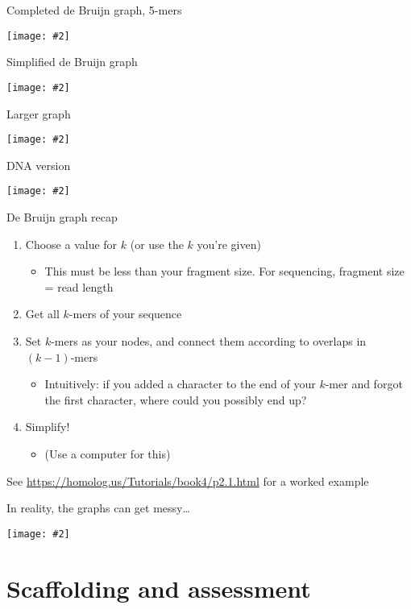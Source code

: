 \documentclass{beamer}
\renewcommand{\c}[1]{\begin{center}#1\end{center}}
\newcommand{\gr}[2][.95]{\c{\texttt{[image: \#2]}}}
\begin{document}
\begin{frame}{Completed de Bruijn graph, 5-mers}
\gr{l4_figs/s18_graph.png}
\end{frame}

\begin{frame}{Simplified de Bruijn graph}
\gr{l4_figs/s19_subgraph.png}
\end{frame}

\begin{frame}{Larger graph}
\gr{l4_figs/s20_table.png}
\end{frame}

\begin{frame}{DNA version}
\gr{l4_figs/s21_kmers.png}
\end{frame}

\begin{frame}{De Bruijn graph recap}
\begin{enumerate}
    \item Choose a value for $k$ (or use the $k$ you're given)
    \begin{itemize}
        \item This must be less than your fragment size. For sequencing, fragment size = read length
    \end{itemize}
    \item Get all $k$-mers of your sequence
    \item Set $k$-mers as your nodes, and connect them according to overlaps in $(k-1)$-mers
    \begin{itemize}
        \item Intuitively: if you added a character to the end of your $k$-mer and forgot the first character, where could you possibly end up?
    \end{itemize}
    \item Simplify!
    \begin{itemize}
        \item (Use a computer for this)
    \end{itemize}
\end{enumerate}

See \url{https://homolog.us/Tutorials/book4/p2.1.html} for a worked example
\end{frame}

\begin{frame}{In reality, the graphs can get messy\ldots}
\gr{l4_figs/s23_real_graph.png}
\end{frame}

\section{Scaffolding and assessment}
\end{document}
